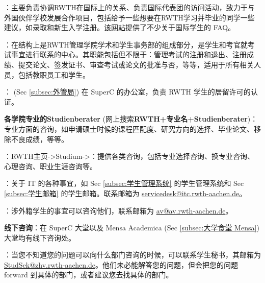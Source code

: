     \href{https://www.rwth-aachen.de/go/id/pvd/lidx/1}{}：主要负责协调RWTH在国际上的关系、负责国际代表团的访问活动，致力于与外国伙伴学校发展合作项目，包括给予一些想要在RWTH学习并毕业的同学一些建议，如录取和新生入学注册。\href{https://linktr.ee/rwthinternationaloffice}{该网站}提供了不少关于国际学生的 FAQ。

    \href{https://www.rwth-aachen.de/cms/root/Die-RWTH/Einrichtungen/Verwaltung/Dezernate/Akademische-und-studentische-Angelegenhe/~rcv/Abteilung-1-3-Zentrales-Pruefungsamt/}{}：在结构上是RWTH管理学院学术和学生事务部的组成部分，是学生和考官就考试事宜进行联系的中心。其职能包括但不限于：管理考试的注册和退出、注册成绩、提交论文、签发证书、审查考试或论文的批准与否，等等，适用于所有相关人员，包括教职员工和学生。

    \href{https://www.rwth-aachen.de/cms/root/studium/Vor-dem-Studium/Internationale-Studierende/Organisation-des-Studienaufenthaltes/Visum-Aufenthaltsrecht/~bpte/Aufenthaltserlaubnis/}{}：  (Sec \ref{subsec:外管局}) 在 SuperC 的办公室，负责 RWTH 学生的居留许可的认证。

    \textbf{各学院专业的Studienberater} (网上搜索\textbf{RWTH+专业名+Studienberater})：专业方面的咨询，如申请硕士时候的课程匹配度、研究方向的选择、毕业论文、移除不良成绩，等等。

    ：RWTH主页->Studium->\href{https://www.rwth-aachen.de/cms/root/Studium/~hzvj/Beratung-Hilfe/}{}：提供各类咨询，包括专业选择咨询、换专业咨询、心理咨询、职业生涯咨询等。

    \href{https://help.itc.rwth-aachen.de/service/b734502cd73e4201b1f763a65a61bf9c/}{}：关于 IT 的各种事宜，如 Sec \ref{subsec:学生管理系统} 的学生管理系统和 Sec \ref{subsec:学生邮箱} 的学生邮箱。联系邮箱为 \href{mailto:servicedesk@itc.rwth-aachen.de}{servicedesk@itc.rwth-aachen.de}。

    \href{https://av.rwth-aachen.de/}{}：涉外籍学生的事宜可以咨询他们，联系邮箱为 \href{mailto:av@av.rwth-aachen.de}{av@av.rwth-aachen.de}。

    \textbf{线下咨询}：在 SuperC 大堂以及 Mensa Academica (Sec \ref{subsec:大学食堂 Mensa}) 大堂均有线下咨询处。

    \href{https://www.rwth-aachen.de/go/id/rcu/}{}：当您不知道您的问题可以向什么部门咨询的时候，可以联系学生秘书，其邮箱为 \href{mailto:StudSek@zhv.rwth-aachen.de}{StudSek@zhv.rwth-aachen.de}。他们未必能解答您的问题，但会把您的问题 forward 到具体的部门，或者建议您去找具体的部门。


